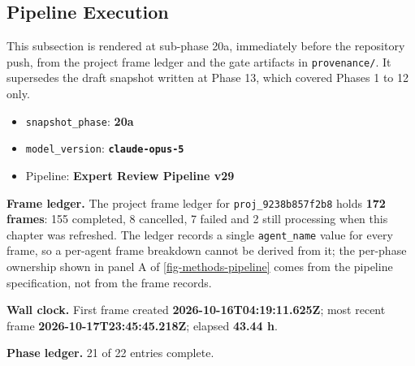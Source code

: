 \documentclass[11pt]{article}
\begin{document}
\subsection{Pipeline Execution}
\label{sec-methods-pipeline}

This subsection is rendered at sub-phase 20a, immediately before the repository push, from the project frame ledger and the gate artifacts in \texttt{provenance/}. It supersedes the draft snapshot written at Phase 13, which covered Phases 1 to 12 only.

\begin{itemize}
\item \texttt{snapshot\_phase}: \textbf{20a}
\item \texttt{model\_version}: \textbf{\texttt{claude-opus-5}}
\item Pipeline: \textbf{Expert Review Pipeline v29}
\end{itemize}

\textbf{Frame ledger.} The project frame ledger for \texttt{proj\_9238b857f2b8} holds \textbf{172 frames}: 155 completed, 8 cancelled, 7 failed and 2 still processing when this chapter was refreshed. The ledger records a single \texttt{agent\_name} value for every frame, so a per-agent frame breakdown cannot be derived from it; the per-phase ownership shown in panel A of \ref{fig-methods-pipeline} comes from the pipeline specification, not from the frame records.

\textbf{Wall clock.} First frame created \textbf{2026-10-16T04:19:11.625Z}; most recent frame \textbf{2026-10-17T23:45:45.218Z}; elapsed \textbf{43.44 h}.

\textbf{Phase ledger.} 21 of 22 entries complete.
\end{document}
